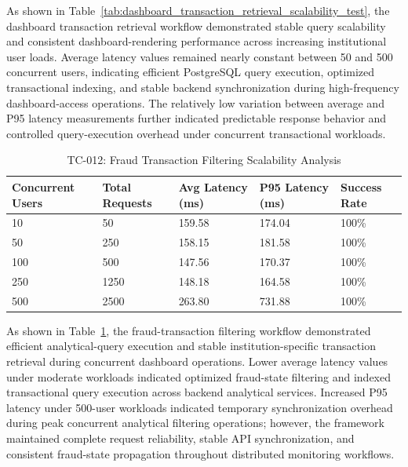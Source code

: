 \renewcommand{\arraystretch}{1}

As shown in Table~\ref{tab:dashboard_transaction_retrieval_scalability_test}, the dashboard transaction retrieval workflow demonstrated stable query scalability and consistent dashboard-rendering performance across increasing institutional user loads. Average latency values remained nearly constant between 50 and 500 concurrent users, indicating efficient PostgreSQL query execution, optimized transactional indexing, and stable backend synchronization during high-frequency dashboard-access operations. The relatively low variation between average and P95 latency measurements further indicated predictable response behavior and controlled query-execution overhead under concurrent transactional workloads.

\renewcommand{\arraystretch}{1.3}

\begin{table}[H]
\centering
\caption{TC-012: Fraud Transaction Filtering Scalability Analysis}
\label{tab:fraud_transaction_filtering_scalability_test}
\vspace{0.2cm}

\begin{tabular}{|p{2.6cm}|p{2.4cm}|p{2.8cm}|p{2.8cm}|p{2.2cm}|}
\hline
\textbf{Concurrent Users} & \textbf{Total Requests} & \textbf{Avg Latency (ms)} & \textbf{P95 Latency (ms)} & \textbf{Success Rate} \\ \hline
10 & 50 & 159.58 & 174.04 & 100\% \\ \hline
50 & 250 & 158.15 & 181.58 & 100\% \\ \hline
100 & 500 & 147.56 & 170.37 & 100\% \\ \hline
250 & 1250 & 148.18 & 164.58 & 100\% \\ \hline
500 & 2500 & 263.80 & 731.88 & 100\% \\ \hline
\end{tabular}
\end{table}

\renewcommand{\arraystretch}{1}

As shown in Table~\ref{tab:fraud_transaction_filtering_scalability_test}, the fraud-transaction filtering workflow demonstrated efficient analytical-query execution and stable institution-specific transaction retrieval during concurrent dashboard operations. Lower average latency values under moderate workloads indicated optimized fraud-state filtering and indexed transactional query execution across backend analytical services. Increased P95 latency under 500-user workloads indicated temporary synchronization overhead during peak concurrent analytical filtering operations; however, the framework maintained complete request reliability, stable API synchronization, and consistent fraud-state propagation throughout distributed monitoring workflows.


